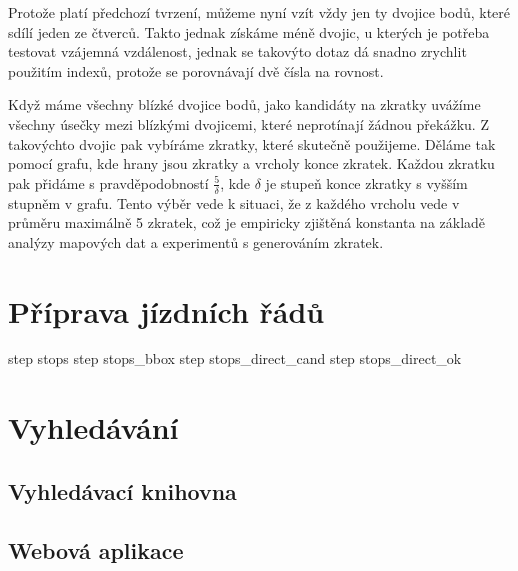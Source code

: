 Protože platí předchozí tvrzení, můžeme nyní vzít vždy jen ty dvojice bodů,
které sdílí jeden ze čtverců. Takto jednak získáme méně dvojic, u kterých je
potřeba testovat vzájemná vzdálenost, jednak se takovýto dotaz dá snadno
zrychlit použitím indexů, protože se porovnávají dvě čísla na rovnost. 

Když máme všechny blízké dvojice bodů, jako kandidáty na zkratky uvážíme
všechny úsečky mezi blízkými dvojicemi, které neprotínají žádnou překážku. Z
takovýchto dvojic pak vybíráme zkratky, které skutečně použijeme. Děláme
tak pomocí grafu, kde hrany jsou zkratky a vrcholy konce zkratek. Každou zkratku
pak přidáme s pravděpodobností $\frac{5}{\delta}$, kde $\delta$ je stupeň konce
zkratky s vyšším stupněm v grafu. Tento výběr vede k situaci, že z každého
vrcholu vede v průměru maximálně 5 zkratek, což je empiricky zjištěná konstanta
na základě analýzy mapových dat a experimentů s generováním zkratek.

\section{Příprava jízdních řádů}
step stops
step stops\_bbox
step stops\_direct\_cand
step stops\_direct\_ok
\section{Vyhledávání}
\subsection{Vyhledávací knihovna}
\subsection{Webová aplikace}
